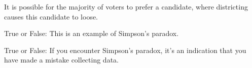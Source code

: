 \documentclass[nooutcomes,noauthor]{ximera}
\begin{document}
\begin{exercise}
  It is possible for the majority of voters to prefer a candidate,
  where districting causes this candidate to loose.

  
  True or False: This is an example of Simpson's paradox.

\end{exercise}




\begin{exercise}
  True or False: If you encounter Simpson's paradox, it's an
  indication that you have made a mistake collecting data.
 
\end{exercise}



\end{document}
